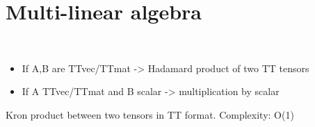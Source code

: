 \documentclass[a4paper,10pt,english]{sphinxmanual}
\begin{document}
\section{Multi-linear algebra}
\label{api-multilinalg:multi-linear-algebra}\label{api-multilinalg::doc}\label{api-multilinalg:module-TensorToolbox}\label{api-multilinalg:module-TensorToolbox.multilinalg}

\begin{fulllineitems}
\label{api-multilinalg:TensorToolbox.multilinalg.mul}~\begin{itemize}
\item {} 
If A,B are TTvec/TTmat -\textgreater{} Hadamard product of two TT tensors

\item {} 
If A TTvec/TTmat and B scalar -\textgreater{} multiplication by scalar

\end{itemize}

\end{fulllineitems}


\begin{fulllineitems}
\label{api-multilinalg:TensorToolbox.multilinalg.kron}
Kron product between two tensors in TT format.
Complexity: O(1)

\end{fulllineitems}

\end{document}
